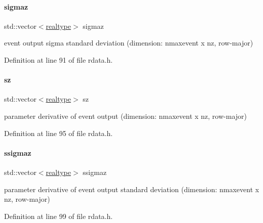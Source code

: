 \mbox{\label{classamici_1_1_return_data_adc3c5ee1620b079cd34137010873f500}} 
\paragraph{\texorpdfstring{sigmaz}{sigmaz}}
{\footnotesize\ttfamily std\+::vector$<$\mbox{\hyperlink{namespaceamici_a1bdce28051d6a53868f7ccbf5f2c14a3}{realtype}}$>$ sigmaz}

event output sigma standard deviation (dimension\+: nmaxevent x nz, row-\/major) 

Definition at line 91 of file rdata.\+h.

\mbox{\label{classamici_1_1_return_data_a6588db55743b7fdebe807b52387d6b37}} 
\paragraph{\texorpdfstring{sz}{sz}}
{\footnotesize\ttfamily std\+::vector$<$\mbox{\hyperlink{namespaceamici_a1bdce28051d6a53868f7ccbf5f2c14a3}{realtype}}$>$ sz}

parameter derivative of event output (dimension\+: nmaxevent x nz, row-\/major) 

Definition at line 95 of file rdata.\+h.

\mbox{\label{classamici_1_1_return_data_a23c0635afe68ab5c73095fa1e4d61055}} 
\paragraph{\texorpdfstring{ssigmaz}{ssigmaz}}
{\footnotesize\ttfamily std\+::vector$<$\mbox{\hyperlink{namespaceamici_a1bdce28051d6a53868f7ccbf5f2c14a3}{realtype}}$>$ ssigmaz}

parameter derivative of event output standard deviation (dimension\+: nmaxevent x nz, row-\/major) 

Definition at line 99 of file rdata.\+h.

